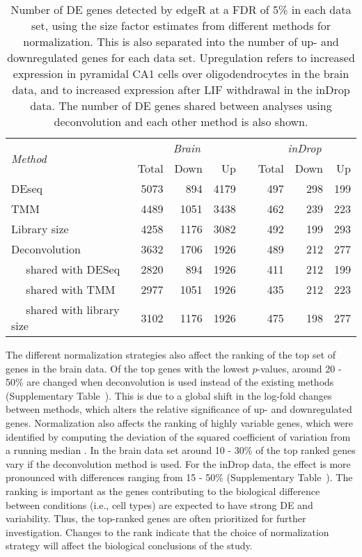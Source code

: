 \documentclass{article}
\begin{document}
\begin{table}[bt]
\caption{
    Number of DE genes detected by edgeR at a FDR of 5\% in each data set, using the size factor estimates from different methods for normalization.
    This is also separated into the number of up- and downregulated genes for each data set.
    Upregulation refers to increased expression in pyramidal CA1 cells over oligodendrocytes in the brain data, and to increased expression after LIF withdrawal in the inDrop data.
    The number of DE genes shared between analyses using deconvolution and each other method is also shown.
}
\begin{center}
\begin{tabular}{l r r r c r r r}
\hline
\multirow{2}{*}{\textit{Method}} & \multicolumn{3}{c}{\textit{Brain}} && \multicolumn{3}{c}{\textit{inDrop}}  \\
\cline{2-4}
\cline{6-8}
& Total & Down & Up && Total & Down & Up \\
\hline
DEseq                               & 5073 & 894  & 4179 && 497 & 298 & 199 \\
TMM                                 & 4489 & 1051 & 3438 && 462 & 239 & 223 \\
Library size                        & 4258 & 1176 & 3082 && 492 & 199 & 293 \\
Deconvolution                       & 3632 & 1706 & 1926 && 489 & 212 & 277 \\
$\quad$ shared with DESeq           & 2820 & 894  & 1926 && 411 & 212 & 199 \\
$\quad$ shared with TMM             & 2977 & 1051 & 1926 && 435 & 212 & 223 \\
$\quad$ shared with library size    & 3102 & 1176 & 1926 && 475 & 198 & 277 \\
\hline                                                   
\end{tabular}
\end{center}
\label{tab:real_de}
\end{table}

The different normalization strategies also affect the ranking of the top set of genes in the brain data.
Of the top genes with the lowest $p$-values, around 20 - 50\% are changed when deconvolution is used instead of the existing methods (Supplementary Table~\supprank{}).
This is due to a global shift in the log-fold changes between methods, which alters the relative significance of up- and downregulated genes.
Normalization also affects the ranking of highly variable genes, which were identified by computing the deviation of the squared coefficient of variation from a running median \cite{Kim2015}.
In the brain data set around 10 - 30\% of the top ranked genes vary if the deconvolution method is used.
For the inDrop data, the effect is more pronounced with differences ranging from 15 - 50\% (Supplementary Table~\suppHVG{}).
The ranking is important as the genes contributing to the biological difference between conditions (i.e., cell types) are expected to have strong DE and variability.
Thus, the top-ranked genes are often prioritized for further investigation.
Changes to the rank indicate that the choice of normalization strategy will affect the biological conclusions of the study.
\end{document}
